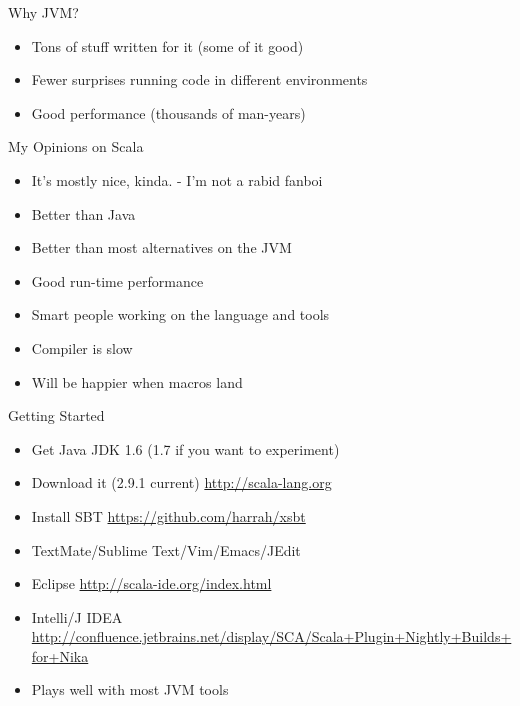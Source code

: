 \documentclass[14pt,t,usepdftitle=false,xcolornames=x11names,svgnames,dvipsnames,usenames]{beamer}
\newcommand{\tinyurl}[1]{
  {\tiny{\textcolor{keyword}{\url{#1}}}}}
\begin{document}
\begin{frame}{Why JVM?}
  \begin{itemize}[<+->]
    \item Tons of stuff written for it (some of it good)
    \item Fewer surprises running code in different environments
    \item Good performance (thousands of man-years)
  \end{itemize}
\end{frame}

\begin{frame}{My Opinions on Scala}
  \begin{itemize}[<+->]
    \item It's mostly nice, kinda. - I'm not a rabid fanboi
    \item Better than Java
    \item Better than most alternatives on the JVM
    \item Good run-time performance
    \item Smart people working on the language and tools
    \item Compiler is slow
    \item Will be happier when macros land
  \end{itemize}
\end{frame}

\begin{frame}{Getting Started}
  \begin{itemize}[<+->]
    \item Get Java JDK 1.6 (1.7 if you want to experiment)
    \item Download it (2.9.1 current) \tinyurl{http://scala-lang.org}
    \item Install SBT \tinyurl{https://github.com/harrah/xsbt}
    \item TextMate/Sublime Text/Vim/Emacs/JEdit
    \item Eclipse \tinyurl{http://scala-ide.org/index.html}
    \item Intelli/J IDEA \tinyurl{http://confluence.jetbrains.net/display/SCA/Scala+Plugin+Nightly+Builds+for+Nika}
    \item Plays well with most JVM tools
  \end{itemize}
\end{frame}
\end{document}
